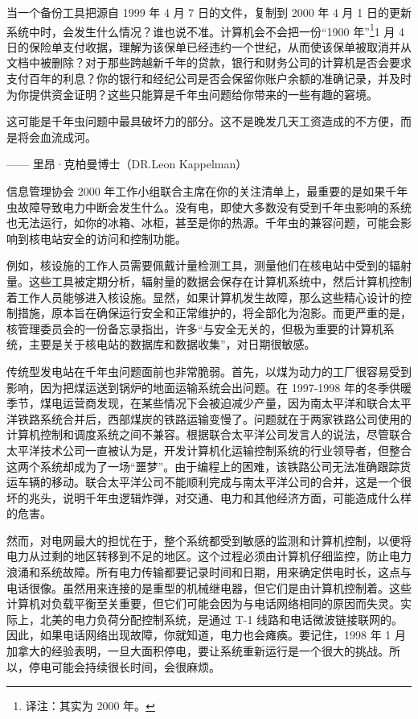 当一个备份工具把源自 1999 年 4 月 7 日的文件，复制到 2000 年 4 月 1 日的更新系统中时，会发生什么情况？谁也说不准。计算机会不会把一份“1900 年”\footnote{译注：其实为 2000 年。}1 月 4 日的保险单支付收据，理解为该保单已经违约一个世纪，从而使该保单被取消并从文档中被删除？对于那些跨越新千年的贷款，银行和财务公司的计算机是否会要求支付百年的利息？你的银行和经纪公司是否会保留你账户余额的准确记录，并及时为你提供资金证明？这些只能算是千年虫问题给你带来的一些有趣的窘境。


\begin{tcolorbox}
这可能是千年虫问题中最具破坏力的部分。这不是晚发几天工资造成的不方便，而是将会血流成河。
\begin{flushright}
—— 里昂·克柏曼博士（DR.Leon Kappelman）
\end{flushright}
\end{tcolorbox}

信息管理协会 2000 年工作小组联合主席在你的关注清单上，最重要的是如果千年虫故障导致电力中断会发生什么。没有电，即使大多数没有受到千年虫影响的系统也无法运行，如你的冰箱、冰柜，甚至是你的热源。千年虫的兼容问题，可能会影响到核电站安全的访问和控制功能。


例如，核设施的工作人员需要佩戴计量检测工具，测量他们在核电站中受到的辐射量。这些工具被定期分析，辐射量的数据会保存在计算机系统中，然后计算机控制着工作人员能够进入核设施。显然，如果计算机发生故障，那么这些精心设计的控制措施，原本旨在确保运行安全和正常维护的，将全部化为泡影。而更严重的是，核管理委员会的一份备忘录指出，许多“与安全无关的，但极为重要的计算机系统，主要是关于核电站的数据库和数据收集”，对日期很敏感。


传统型发电站在千年虫问题面前也非常脆弱。首先，以煤为动力的工厂很容易受到影响，因为把煤运送到锅炉的地面运输系统会出问题。在 1997-1998 年的冬季供暖季节，煤电运营商发现，在某些情况下会被迫减少产量，因为南太平洋和联合太平洋铁路系统合并后，西部煤炭的铁路运输变慢了。问题就在于两家铁路公司使用的计算机控制和调度系统之间不兼容。根据联合太平洋公司发言人的说法，尽管联合太平洋技术公司一直被认为是，开发计算机化运输控制系统的行业领导者，但整合这两个系统却成为了一场“噩梦”。由于编程上的困难，该铁路公司无法准确跟踪货运车辆的移动。联合太平洋公司不能顺利完成与南太平洋公司的合并，这是一个很坏的兆头，说明千年虫逻辑炸弹，对交通、电力和其他经济方面，可能造成什么样的危害。


然而，对电网最大的担忧在于，整个系统都受到敏感的监测和计算机控制，以便将电力从过剩的地区转移到不足的地区。这个过程必须由计算机仔细监控，防止电力浪涌和系统故障。所有电力传输都要记录时间和日期，用来确定供电时长，这点与电话很像。虽然用来连接的是重型的机械继电器，但它们是由计算机控制着。这些计算机对负载平衡至关重要，但它们可能会因为与电话网络相同的原因而失灵。实际上，北美的电力负荷分配控制系统，是通过 T-1 线路和电话微波链接联网的。因此，如果电话网络出现故障，你就知道，电力也会瘫痪。要记住，1998 年 1 月加拿大的经验表明，一旦大面积停电，要让系统重新运行是一个很大的挑战。所以，停电可能会持续很长时间，会很麻烦。


